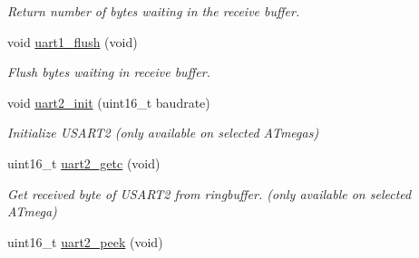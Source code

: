 \begin{DoxyCompactItemize}
\begin{DoxyCompactList}\small\item\em Return number of bytes waiting in the receive buffer. \end{DoxyCompactList}\item 
\hypertarget{group__avr-uart_ga07f72e8f865f43b2d0725d19ecd5fb55}{void \hyperlink{group__avr-uart_ga07f72e8f865f43b2d0725d19ecd5fb55}{uart1\-\_\-flush} (void)}\label{group__avr-uart_ga07f72e8f865f43b2d0725d19ecd5fb55}

\begin{DoxyCompactList}\small\item\em Flush bytes waiting in receive buffer. \end{DoxyCompactList}\item 
void \hyperlink{group__avr-uart_gae2a543d34d454fb4f41fe80fee0ae0bb}{uart2\-\_\-init} (uint16\-\_\-t baudrate)
\begin{DoxyCompactList}\small\item\em Initialize U\-S\-A\-R\-T2 (only available on selected A\-Tmegas) \end{DoxyCompactList}\item 
uint16\-\_\-t \hyperlink{group__avr-uart_gafcfa52b819c52e3a8b4cfdc74fe9efb3}{uart2\-\_\-getc} (void)
\begin{DoxyCompactList}\small\item\em Get received byte of U\-S\-A\-R\-T2 from ringbuffer. (only available on selected A\-Tmega) \end{DoxyCompactList}\item 
\hypertarget{group__avr-uart_gaccc2bf6c89f4d38149144056e6a4d64e}{uint16\-\_\-t \hyperlink{group__avr-uart_gaccc2bf6c89f4d38149144056e6a4d64e}{uart2\-\_\-peek} (void)}\label{group__avr-uart_gaccc2bf6c89f4d38149144056e6a4d64e}


\end{DoxyCompactItemize}
